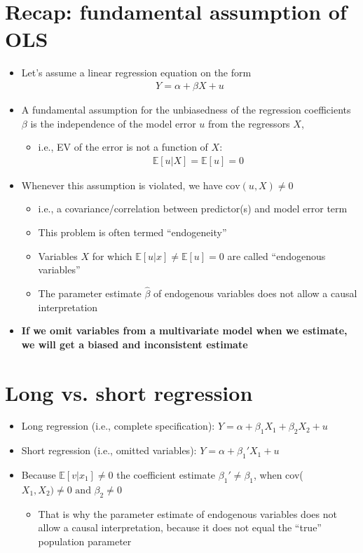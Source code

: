 \documentclass[10pt]{article}
\begin{document}
\section{Recap: fundamental assumption of OLS}
\begin{itemize}
    \item Let's assume a linear regression equation on the form 
    \begin{gather*}
        Y = \alpha + \beta X + u
    \end{gather*}
    \item A fundamental assumption for the unbiasedness of the regression coefficients $\beta $ is the independence of the model error $u $ from the regressors $X $,
    \begin{itemize}
        \item i.e., EV of the error is not a function of $X $: 
        \begin{gather*}
            \mathbb{E}[u|X] = \mathbb{E}[u] = 0
        \end{gather*}
    \end{itemize}
    \item Whenever this assumption is violated, we have $\text{cov}(u, X)\neq 0 $
    \begin{itemize}
        \item i.e., a covariance/correlation between predictor(s) and model error term 
        \item This problem is often termed ``endogeneity''
        \item Variables $X $ for which $\mathbb{E}[u|x] \neq \mathbb{E}[u] = 0 $ are called ``endogenous variables''
        \item The parameter estimate $\hat{\beta}$ of endogenous variables does not allow a causal interpretation
    \end{itemize}
    \item \textbf{If we omit variables from a multivariate model when we estimate, we will get a biased and inconsistent estimate}
\end{itemize}
\newpage 
\section{Long vs. short regression}
\begin{itemize}
    \item Long regression (i.e., complete specification): $Y = \alpha + \beta_1X_1 + \beta_2X_2 + u $
    \item Short regression (i.e., omitted variables): $Y = \alpha + \beta_1' X_1 + u $
    \item Because $\mathbb{E}[v|x_1] \neq 0 $ the coefficient estimate $\beta_1'\neq \beta_1 $, when cov($X_1, X_2) \neq 0 \text{ and }\beta_2\neq 0 $
    \begin{itemize}
        \item That is why the parameter estimate of endogenous variables does not allow a causal interpretation, because it does not equal the ``true'' population parameter
    \end{itemize}
\end{itemize}
\end{document}
